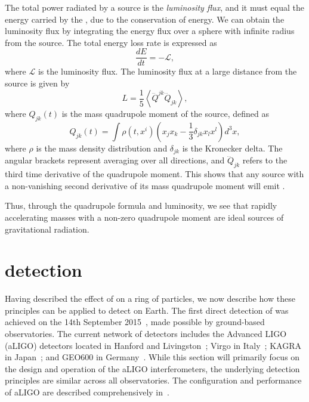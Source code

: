 The total power radiated by a source is the \textit{luminosity flux}, and it must equal the energy carried by the \gws, due to the conservation of energy. We can obtain the luminosity flux by integrating the energy flux over a sphere with infinite radius from the source. The total energy loss rate is expressed as
%
\begin{equation}
    \frac{dE}{dt} = -\mathcal{L},
    \label{1:eq:de_dt}
\end{equation}
%
where $\mathcal{L}$ is the \gwadj luminosity flux. The luminosity flux at a large distance from the source is given by
%
\begin{equation}
    L = \frac{1}{5} \left\langle \dddot{Q}^{jk} \dddot{Q}_{jk} \right\rangle,
    \label{1:eq:luminosity_flux}
\end{equation}
%
where $Q_{jk}(t)$ is the mass quadrupole moment of the source, defined as
%
\begin{equation}
    Q_{jk}(t) = \int \rho(t, x^i) \left( x_j x_k - \frac{1}{3} \delta_{jk} x_l x^l \right) d^3x,
\end{equation}
%
where $\rho$ is the mass density distribution and $\delta_{jk}$ is the Kronecker delta. The angular brackets represent averaging over all directions, and $\dddot{Q}_{jk}$ refers to the third time derivative of the quadrupole moment. This shows that any source with a non-vanishing second derivative of its mass quadrupole moment will emit \gws.

Thus, through the quadrupole formula and \gwadj luminosity, we see that rapidly accelerating masses with a non-zero quadrupole moment are ideal sources of gravitational radiation.





















\section{\label{1:sec:gravitational-wave-detection}\Gwadj detection}

Having described the effect of \gws on a ring of particles, we now describe how these principles can be applied to detect \gws on Earth. The first direct detection of \gws was achieved on the 14th September 2015~\cite{GW150914:2016}, made possible by ground-based \gwadj observatories. The current network of \gwadj detectors includes the Advanced LIGO (aLIGO) detectors located in Hanford and Livingston~\cite{aLIGO:2015}; Virgo in Italy~\cite{aVirgo:2015}; KAGRA in Japan~\cite{KAGRA:2021}; and GEO600 in Germany~\cite{GEO600:2002}. While this section will primarily focus on the design and operation of the aLIGO interferometers, the underlying detection principles are similar across all observatories. The configuration and performance of aLIGO are described comprehensively in~\cite{aLIGO:2015}.

